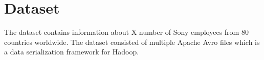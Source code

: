 \section{Dataset}
The dataset contains information about X number of Sony employees from 80 countries worldwide.
The dataset consisted of multiple Apache Avro files which is a data serialization framework for Hadoop.\cite{apacheavro}